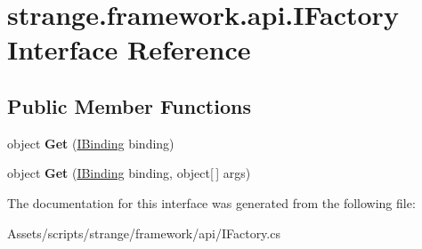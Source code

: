 \hypertarget{interfacestrange_1_1framework_1_1api_1_1_i_factory}{\section{strange.\-framework.\-api.\-I\-Factory Interface Reference}
\label{interfacestrange_1_1framework_1_1api_1_1_i_factory}
}
\subsection*{Public Member Functions}
\begin{DoxyCompactItemize}
\item 
\hypertarget{interfacestrange_1_1framework_1_1api_1_1_i_factory_a279a39b6a54319b334be41acf85a682d}{object {\bfseries Get} (\hyperlink{interfacestrange_1_1framework_1_1api_1_1_i_binding}{I\-Binding} binding)}\label{interfacestrange_1_1framework_1_1api_1_1_i_factory_a279a39b6a54319b334be41acf85a682d}

\item 
\hypertarget{interfacestrange_1_1framework_1_1api_1_1_i_factory_a2153b295db08b7fd8087bcbb7450402d}{object {\bfseries Get} (\hyperlink{interfacestrange_1_1framework_1_1api_1_1_i_binding}{I\-Binding} binding, object\mbox{[}$\,$\mbox{]} args)}\label{interfacestrange_1_1framework_1_1api_1_1_i_factory_a2153b295db08b7fd8087bcbb7450402d}

\end{DoxyCompactItemize}


The documentation for this interface was generated from the following file\-:\begin{DoxyCompactItemize}
\item 
Assets/scripts/strange/framework/api/I\-Factory.\-cs\end{DoxyCompactItemize}
